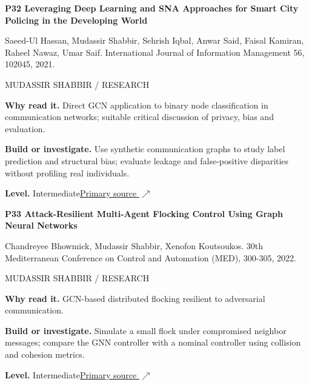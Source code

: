 \documentclass[11pt,letterpaper]{article}
\begin{document}
\begin{minipage}{\linewidth}
{\large\bfseries P32 Leveraging Deep Learning and SNA Approaches for Smart City Policing in the Developing World}\par
Saeed-Ul Hassan, Mudassir Shabbir, Sehrish Iqbal, Anwar Said, Faisal Kamiran, Raheel Nawaz, Umar Saif. International Journal of Information Management 56, 102045, 2021.\par
\textcolor{ink}{\small MUDASSIR SHABBIR / RESEARCH}\par
\textbf{Why read it.} Direct GCN application to binary node classification in communication networks; suitable critical discussion of privacy, bias and evaluation.\par
\textbf{Build or investigate.} Use synthetic communication graphs to study label prediction and structural bias; evaluate leakage and false-positive disparities without profiling real individuals.\par
\textbf{Level.} Intermediate\quad\href{https://doi.org/10.1016/j.ijinfomgt.2019.102045}{Primary source $\nearrow$}\par
\end{minipage}\par\vspace{10pt}
\begin{minipage}{\linewidth}
{\large\bfseries P33 Attack-Resilient Multi-Agent Flocking Control Using Graph Neural Networks}\par
Chandreyee Bhowmick, Mudassir Shabbir, Xenofon Koutsoukos. 30th Mediterranean Conference on Control and Automation (MED), 300-305, 2022.\par
\textcolor{ink}{\small MUDASSIR SHABBIR / RESEARCH}\par
\textbf{Why read it.} GCN-based distributed flocking resilient to adversarial communication.\par
\textbf{Build or investigate.} Simulate a small flock under compromised neighbor messages; compare the GNN controller with a nominal controller using collision and cohesion metrics.\par
\textbf{Level.} Intermediate\quad\href{https://cs.vuse.vanderbilt.edu/koutsoxd/www/Publications/Attack-Resilient_Multi-Agent_Flocking_Control_Using_Graph_Neural_Networks.pdf}{Primary source $\nearrow$}\par
\end{minipage}\par\vspace{10pt}
\end{document}
